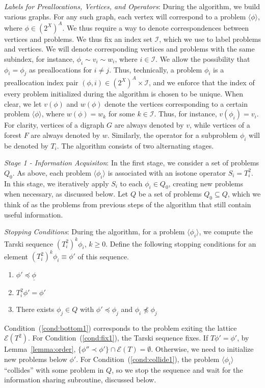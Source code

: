 \documentclass[11pt,reqno]{amsart}
\theoremstyle{definition}
\numberwithin{equation}{section}
\newcommand{\ul}{\underline}
\newcommand{\lag}{\langle}
\newcommand{\rag}{\rangle}
\newcommand{\pre}{\phi}
\newcommand{\prealloc}{(2^X)^A}
\newcommand{\sub}{\subseteq}
\newcommand{\fix}{\mathcal{E}}
\newcommand{\peq}{\preceq}
\newcommand{\pe}{\prec}
\newcommand{\bopre}{\ul{\pre}}
\newcommand{\acto}{Q_0}
\newcommand{\act}{Q}
\begin{document}
\emph{Labels for Preallocations, Vertices, and Operators}:
During the algorithm, we build various graphs.
For any such graph, each vertex will correspond to a problem $\lag \pre \rag$, where $\pre \in \prealloc$.
We thus require a way to denote correspondences between vertices and problems.
We thus fix an index set $\mathcal{I}$, which we use to label problems and vertices.
We will denote corresponding vertices and problems with the same subindex, for instance, $\pre_i \sim v_i \sim w_i$, where $i \in \mathcal{I}$. 
We allow the possibility that $\pre_i = \pre_j$ as preallocations for $i \not = j$.
Thus, technically, a problem $\pre_i$ is a preallocation index pair $(\pre,i) \in \prealloc \times \mathcal{I}$, and we enforce that the index of every problem initialized during the algorithm is chosen to be unique.
When clear, we let $v(\pre)$ and $w(\pre)$ denote the vertices corresponding to a certain problem $\lag \pre \rag$, where $w(\pre) = w_k$ for some $k \in \mathcal{I}$.
Thus, for instance, $v(\pre_i) = v_i$.
For clarity, vertices of a digraph $G$ are always denoted by $v$, while vertices of a forest $F$ are always denoted by $w$.
Similarly, the operator for a subproblem $\pre_i$ will be denoted by $T_i$.
The algorithm consists of two alternating stages. 

\emph{Stage 1 - Information Acquisiton}: In the first stage, we consider a set of problems $\acto$.
As above, each problem $\lag \pre_i \rag$ is associated with an isotone operator $S_i = T_i^2$.
In this stage, we iteratively apply $S_i$ to each $\pre_i \in \acto$, creating new problems when necessary, as discussed below. 
Let $\act$ be a set of problems $\acto \sub \act$, which we think of as the problems from previous steps of the algorithm that still contain useful information.  

\emph{Stopping Conditions}:
During the algorithm, for a problem $\lag \pre_i \rag $, we compute the Tarski sequence $(T_i^2)^k \pre_i$, $k \geq 0$. 
Define the following stopping conditions for an element $ (T_i^2)^k \pre_i \equiv \pre'$ of this sequence.
\begin{enumerate}
\item $\pre' \peq \bopre$ \label{cond:bottom1}
\item $T_i^2 \pre'= \pre'$ \label{cond:fix1}
\item There exists $\pre_j\in \act$ with $\pre' \peq \pre_j$ and $\pre_i \not \peq \pre_j$ \label{cond:collide1}
\end{enumerate}

Condition~(\ref{cond:bottom1}) corresponds to the problem exiting the lattice $\fix(T^2)$. 
For Condition~(\ref{cond:fix1}), the Tarski sequence fixes.
If $T\pre' = \pre'$, by Lemma~\ref{lemma:order}, $\{\pre'' \pe \pre'\} \cap \fix(T) = \emptyset$. 
Otherwise, we need to initialize new problems below $\pre'$.
For Condition~(\ref{cond:collide1}), the problem $\lag \pre_i \rag$ ``collides'' with some problem in $\act$, so we stop the sequence and wait for the information sharing subroutine, discussed below.
\end{document}
